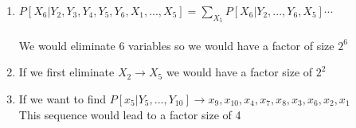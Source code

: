 \begin{enumerate}
  \item \phantom{text}
        
        \begin{latin}
          $P[X_6|Y_2,Y_3,Y_4,Y_5,Y_6,X_1,...,X_5]= \sum_{X_5}P[X_6|Y_2,...,Y_6,X_5]\cdots$
          \\\\
          We would eliminate 6 variables so we would have a factor of size $2^6$
          \\ 
          
        \end{latin}
  \item \phantom{text}
        \begin{latin}
          If we first eliminate $X_2 \rightarrow X_5$ we would have a factor size of $2^2$
        \end{latin}
  \item \phantom{text}
        \begin{latin}
          If we want to find $P[x_5|Y_5,...,Y_{10}] \rightarrow x_9,x_{10},x_4,x_7,x_8,x_3,x_6,x_2,x_1$\\
          This sequence would lead to a factor size of 4
        \end{latin}
\end{enumerate}
